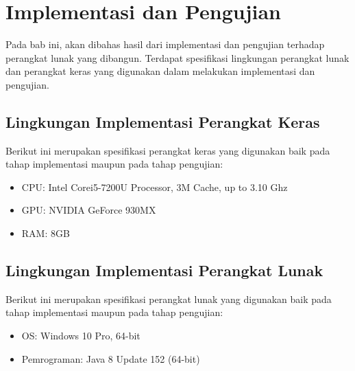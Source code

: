 \chapter{Implementasi dan Pengujian}
Pada bab ini, akan dibahas hasil dari implementasi dan pengujian terhadap perangkat lunak yang dibangun. Terdapat spesifikasi lingkungan perangkat lunak dan perangkat keras yang digunakan dalam melakukan implementasi dan pengujian.

\section{Lingkungan Implementasi Perangkat Keras}
Berikut ini merupakan spesifikasi perangkat keras yang digunakan baik pada tahap implementasi maupun pada tahap pengujian:
\begin{itemize}
	\item CPU: Intel\textsuperscript{\textregistered}{ }Core\texttrademark{ }i5-7200U Processor, 3M Cache, up to 3.10 Ghz
	\item GPU: NVIDIA GeForce 930MX
	\item RAM: 8GB
\end{itemize}

\section{Lingkungan Implementasi Perangkat Lunak}
Berikut ini merupakan spesifikasi perangkat lunak yang digunakan baik pada tahap implementasi maupun pada tahap pengujian:
\begin{itemize}
	\item OS: Windows 10 Pro, 64-bit
	\item Pemrograman: Java 8 Update 152 (64-bit)
\end{itemize}

